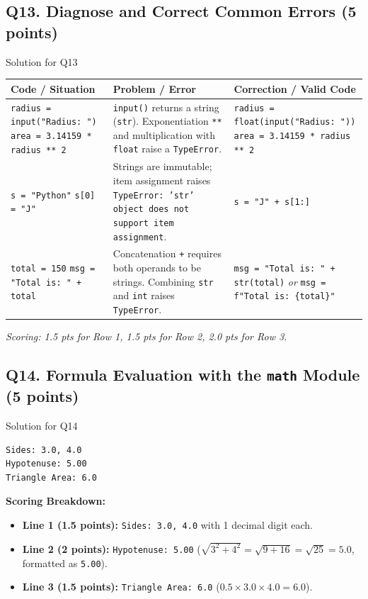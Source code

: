 \documentclass[11pt,a4paper]{article}
\begin{document}
\subsection*{Q13. Diagnose and Correct Common Errors (5 points)}
\begin{solbox}{Solution for Q13}
\renewcommand{\arraystretch}{1.3}
\begin{tabularx}{\textwidth}{|p{4.5cm}|X|X|}
\hline
\textbf{Code / Situation} & \textbf{Problem / Error} & \textbf{Correction / Valid Code} \\
\hline
\texttt{radius = input("Radius: ")}\newline
\texttt{area = 3.14159 * radius ** 2} &
\texttt{input()} returns a string (\texttt{str}). Exponentiation \texttt{**} and multiplication with \texttt{float} raise a \texttt{TypeError}. &
\texttt{radius = float(input("Radius: "))}\newline
\texttt{area = 3.14159 * radius ** 2} \\
\hline
\texttt{s = "Python"}\newline
\texttt{s[0] = "J"} &
Strings are immutable; item assignment raises \texttt{TypeError: 'str' object does not support item assignment}. &
\texttt{s = "J" + s[1:]} \\
\hline
\texttt{total = 150}\newline
\texttt{msg = "Total is: " + total} &
Concatenation \texttt{+} requires both operands to be strings. Combining \texttt{str} and \texttt{int} raises \texttt{TypeError}. &
\texttt{msg = "Total is: " + str(total)}\newline
\textit{or} \texttt{msg = f"Total is: \{total\}"} \\
\hline
\end{tabularx}
\textit{Scoring: 1.5 pts for Row 1, 1.5 pts for Row 2, 2.0 pts for Row 3.}
\end{solbox}

\subsection*{Q14. Formula Evaluation with the \texttt{math} Module (5 points)}
\begin{solbox}{Solution for Q14}
\begin{lstlisting}
Sides: 3.0, 4.0
Hypotenuse: 5.00
Triangle Area: 6.0
\end{lstlisting}
\textbf{Scoring Breakdown:}
\begin{itemize}[leftmargin=2em]
  \item \textbf{Line 1 (1.5 points):} \texttt{Sides: 3.0, 4.0} with 1 decimal digit each.
  \item \textbf{Line 2 (2 points):} \texttt{Hypotenuse: 5.00} ($\sqrt{3^2 + 4^2} = \sqrt{9 + 16} = \sqrt{25} = 5.0$, formatted as \texttt{5.00}).
  \item \textbf{Line 3 (1.5 points):} \texttt{Triangle Area: 6.0} ($0.5 \times 3.0 \times 4.0 = 6.0$).
\end{itemize}
\end{solbox}
\end{document}
